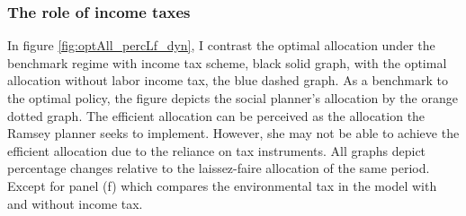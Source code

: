 

\subsubsection{The role of income taxes}\label{subsec:notaul}



In figure \ref{fig:optAll_percLf_dyn}, I contrast the optimal allocation under the benchmark regime with income tax scheme, black solid graph, with the optimal allocation without labor income tax, the blue dashed graph. As a benchmark to the optimal policy, the figure depicts the social planner's allocation by the orange dotted graph. The efficient allocation can be perceived as the allocation the Ramsey planner seeks to implement. However, she may not be able to achieve the efficient allocation due to the reliance on tax instruments.
All graphs depict percentage changes relative to the laissez-faire allocation of the same period. Except for panel (f) which compares the environmental tax in the model with and without income tax. 

